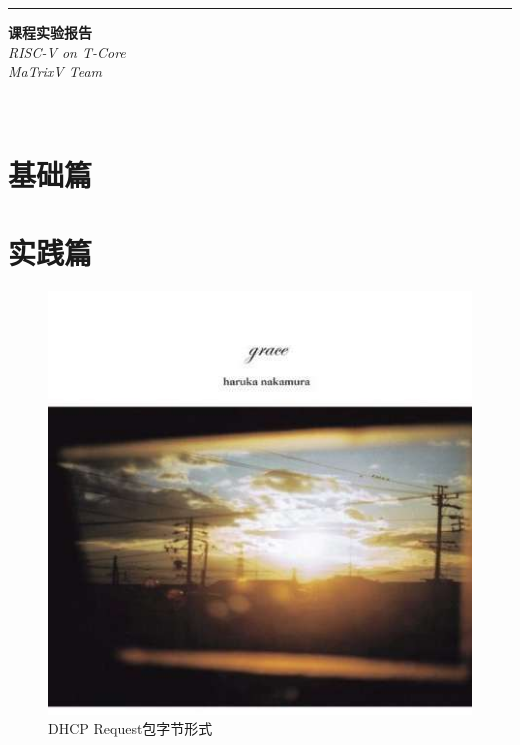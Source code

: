 \documentclass[a4paper, 11pt, oneside]{book} %
\numberwithin{equation}{subsection}
\begin{document}
	\begin{titlepage} %
		
		\raggedleft %
		
		\rule{1pt}{\textheight} %
		\hspace{0.05\textwidth} %
		\parbox[b]{0.75\textwidth}{ %
			
			{\Huge\bfseries  课程实验报告}\\[2\baselineskip] %
			{\LARGE\textit{RISC-V on T-Core}}\\[4\baselineskip] %
			{\Large\textit{MaTrixV Team}} %
			
			\vspace{0.5\textheight} %
			
			{\noindent }\\[\baselineskip] %
		}
	\end{titlepage}
	\tableofcontents
	\section{基础篇}
	\subsection{}
	\section{实践篇}
	
	\begin{figure}[H]
		\centering  
		\includegraphics[scale=0.7]{img/avatar.jpg}   
		\caption{DHCP Request包字节形式}
	\end{figure}
\end{document}
